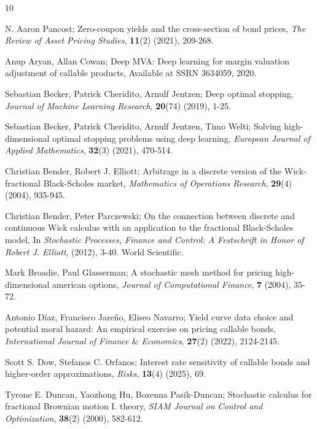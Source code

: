 \documentclass[reqno]{amsart}
\begin{document}
\begin{thebibliography}{10}

 N. Aaron Pancost;
Zero-coupon yields and the cross-section of bond prices,
\emph{The Review of Asset Pricing Studies}, \textbf{11}(2) (2021), 209-268.

 Anup Aryan, Allan Cowan;
Deep MVA: Deep learning for margin valuation adjustment of callable products,
Available at SSRN 3634059, 2020.

 Sebastian Becker, Patrick Cheridito, Arnulf Jentzen;
Deep optimal stopping,
\emph{Journal of Machine Learning Research}, \textbf{20}(74) (2019), 1-25.

 Sebastian Becker, Patrick Cheridito, Arnulf Jentzen, Timo Welti;
Solving high-dimensional optimal stopping problems using deep learning,
\emph{European Journal of Applied Mathematics}, \textbf{32}(3) (2021), 470-514.

 Christian Bender, Robert J. Elliott;
Arbitrage in a discrete version of the Wick-fractional Black-Scholes market,
\emph{Mathematics of Operations Research}, \textbf{29}(4) (2004), 935-945.

 Christian Bender, Peter Parczewski;
On the connection between discrete and continuous Wick calculus with an application to the fractional Black-Scholes model,
In \emph{Stochastic Processes, Finance and Control: A Festschrift in Honor of Robert J. Elliott}, (2012), 3-40. World Scientific.

 Mark Broadie, Paul Glasserman;
A stochastic mesh method for pricing high-dimensional american options,
\emph{Journal of Computational Finance}, \textbf{7} (2004), 35-72.

 Antonio D\'{i}az, Francisco Jare\~{n}o, Eliseo Navarro;
Yield curve data choice and potential moral hazard: An empirical exercise on pricing callable bonds,
\emph{International Journal of Finance $\&$ Economics}, \textbf{27}(2) (2022), 2124-2145.

 Scott S. Dow, Stefanos C. Orfanos;
Interest rate sensitivity of callable bonds and higher-order approximations,
\emph{Risks}, \textbf{13}(4) (2025), 69.

 Tyrone E. Duncan, Yaozhong Hu, Bozenna Pasik-Duncan;
Stochastic calculus for fractional Brownian motion I. theory,
\emph{SIAM Journal on Control and Optimization}, \textbf{38}(2) (2000), 582-612.


\end{thebibliography}
\end{document}
